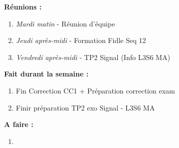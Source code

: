 \textbf{Réunions :}
\begin{enumerate}[label=\textbullet]
	\item \textit{Mardi matin} - Réunion d'équipe
	\item \textit{Jeudi après-midi} - Formation Fidle Seq 12
	\item \textit{Vendredi après-midi} - TP2 Signal (Info L3S6 MA)
\end{enumerate}
\textbf{Fait durant la semaine :}
\begin{enumerate}[label=\textbullet]
	\item Fin Correction CC1 + Préparation correction exam
	\item Finir préparation TP2 exo Signal - L3S6 MA
\end{enumerate}
\textbf{A faire :}
\begin{enumerate}[label=\textbullet]
	\item 
\end{enumerate}